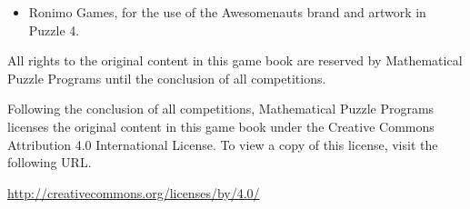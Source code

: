 \begin{itemize}
\item Ronimo Games, for the use of the Awesomenauts brand
      and artwork in Puzzle 4.
\end{itemize}


All rights to the original content in this game book are reserved by
Mathematical Puzzle Programs until the conclusion
of all \phEventName competitions.

Following the conclusion of all \phEventName competitions,
Mathematical Puzzle Programs licenses the original content in this game book
under the Creative Commons Attribution 4.0
International License. To view a copy of this license, visit the following URL.

\begin{center}
  \url{http://creativecommons.org/licenses/by/4.0/}
\end{center}

